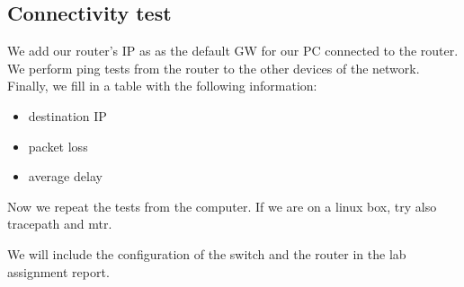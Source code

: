\subsection{Connectivity test}

We add our router's IP as as the default GW for our PC connected to the router.
We perform ping tests from the router to the other devices of the network.
Finally, we fill in a table with the following information:
\begin{itemize}
\item destination IP
\item packet loss
\item average delay
\end{itemize}

Now we repeat the tests from the computer.
If we are on a linux box, try also tracepath and mtr.

We will include the configuration of the switch and the router in the  lab assignment report.

